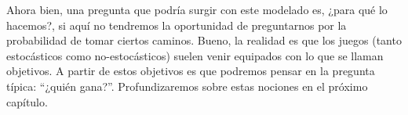 Ahora bien, una pregunta que podría surgir con este modelado es, ¿para qué lo
hacemos?, si aquí no tendremos la oportunidad de preguntarnos por la
probabilidad de tomar ciertos caminos. Bueno, la realidad es que los juegos
(tanto estocásticos como no-estocásticos) suelen venir equipados con lo que se
llaman objetivos. A partir de estos objetivos es que podremos pensar en la
pregunta típica: ``¿quién gana?''. Profundizaremos sobre estas nociones en el
próximo capítulo.





